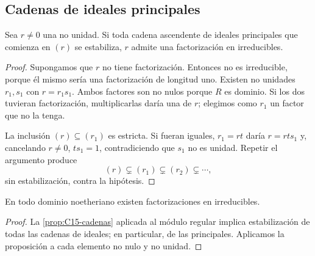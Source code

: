 \subsection{Cadenas de ideales principales}
\begin{prop}\label{prop:C16-existencia}
Sea $r\ne0$ una no unidad. Si toda cadena ascendente de ideales principales que comienza en $(r)$ se estabiliza, $r$ admite una factorización en irreducibles.
\end{prop}
\begin{proof}
Supongamos que $r$ no tiene factorización. Entonces no es irreducible, porque él mismo sería una factorización de longitud uno. Existen no unidades $r_1,s_1$ con $r=r_1s_1$. Ambos factores son no nulos porque $R$ es dominio. Si los dos tuvieran factorización, multiplicarlas daría una de $r$; elegimos como $r_1$ un factor que no la tenga.

La inclusión $(r)\subseteq(r_1)$ es estricta. Si fueran iguales, $r_1=rt$ daría $r=rts_1$ y, cancelando $r\ne0$, $ts_1=1$, contradiciendo que $s_1$ no es unidad. Repetir el argumento produce
\[
(r)\subsetneq(r_1)\subsetneq(r_2)\subsetneq\cdots,
\]
sin estabilización, contra la hipótesis.
\end{proof}

\begin{coro}\label{coro:C16-noetheriano}
En todo dominio noetheriano existen factorizaciones en irreducibles.
\end{coro}
\begin{proof}
La \cref{prop:C15-cadenas} aplicada al módulo regular implica estabilización de todas las cadenas de ideales; en particular, de las principales. Aplicamos la proposición a cada elemento no nulo y no unidad.
\end{proof}

